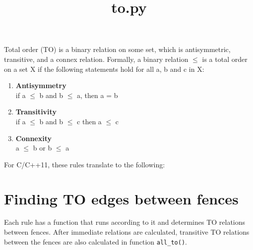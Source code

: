 \documentclass[dvipsnames]{article}
\date{}
\newcommand{\fun}[2]{\color{Sepia}\texttt{#1(\color{Gray}\textit{#2}\color{Sepia})}\color{black}}
\begin{document}
\title{to.py}
\maketitle

Total order (TO) is a binary relation on some set, which is antisymmetric, transitive, and a connex relation. Formally, a binary relation $\leq$  is a total order on a set X if the following statements hold for all a, b and c in X:
\begin{enumerate}
    \item \textbf{Antisymmetry}\\
        if a $\leq$ b and b $\leq$ a, then a = b
    \item \textbf{Transitivity}\\
        if a $\leq$ b and b $\leq$ c then a $\leq$ c
    \item \textbf{Connexity}\\
        a $\leq$ b or b $\leq$ a
\end{enumerate}

For C/C++11, these rules translate to the following:


\section{Finding TO edges between fences}
Each rule has a function that runs according to it and determines TO relations between fences. After immediate relations are calculated, transitive TO relations between the fences are also calculated in function \fun{all\_to}{}.
\end{document}
